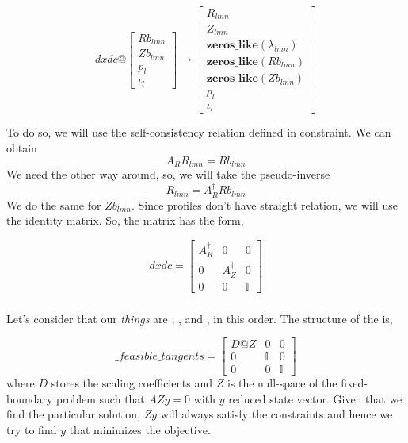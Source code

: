 \begin{equation}
    dxdc @ \begin{bmatrix}
        Rb_{lmn} \\ Zb_{lmn} \\ p_l \\ \iota_l
    \end{bmatrix} \rightarrow \begin{bmatrix}
        R_{lmn} \\ Z_{lmn} \\ \textbf{zeros\_like}(\lambda_{lmn}) \\ \textbf{zeros\_like}(Rb_{lmn}) \\ \textbf{zeros\_like}(Zb_{lmn}) \\ p_l \\ \iota_l
    \end{bmatrix} \label{dxdc}
\end{equation}

To do so, we will use the self-consistency relation defined in  constraint. We can obtain
\begin{equation}
    A_RR_{lmn} = Rb_{lmn}
\end{equation}
We need the other way around, so, we will take the pseudo-inverse
\begin{equation}
    R_{lmn} = A_R^\dagger Rb_{lmn}
\end{equation}
We do the same for $Zb_{lmn}$. Since profiles don't have straight relation, we will use the identity matrix. So, the matrix  has the form,

\begin{equation}
    dxdc = \begin{bmatrix}
        A_R^\dagger & 0 & 0 \\
        0 & A_Z^\dagger & 0 \\
        0 & 0 & \mathbb{I} 
    \end{bmatrix}
\end{equation}


\subsubsection{}

Let's consider that our \textit{things} are , , and , in this order. The structure of the  is,

\begin{equation}
    \_feasible\_tangents = \begin{bmatrix}
        D@Z & 0 & 0 \\
        0 & \mathbb{I} & 0 \\
        0 & 0 & \mathbb{I} 
    \end{bmatrix}
\end{equation}
where $D$ stores the scaling coefficients and $Z$ is the null-space of the fixed-boundary problem such that $AZy=0$ with $y$ reduced state vector. Given that we find the particular solution, $Zy$ will always satisfy the constraints and hence we try to find $y$ that minimizes the objective.


